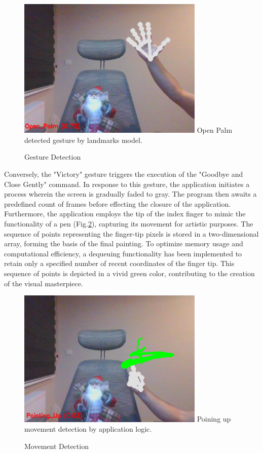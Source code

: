 \documentclass[journal]{IEEEtran}
\begin{document}
\begin{figure}[!t]
  \centering
  \includegraphics[width=3.5in]{photo/1.png}
  Open Palm detected gesture by landmarks model.
  \caption{Gesture Detection}
  \label{fig:gesture_detect}
\end{figure}

Conversely, the "Victory" gesture triggers the execution of the "Goodbye and Close Gently" command. In response to this gesture, the 
application initiates a process wherein the screen is gradually faded to gray. The program then awaits a predefined count of frames before 
effecting the closure of the application.
Furthermore, the application employs the tip of the index finger to mimic the functionality of a pen (Fig.\ref{fig:move_detect}), capturing its movement for artistic 
purposes. The sequence of points representing the finger-tip pixels is stored in a two-dimensional array, forming the basis of the final 
painting. To optimize memory usage and computational efficiency, a dequeuing functionality has been implemented to retain only a specified 
number of recent coordinates of the finger tip. This sequence of points is depicted in a vivid green color, contributing to the creation 
of the visual masterpiece.

\begin{figure}[!t]
  \centering
  \includegraphics[width=3.5in]{photo/2.png}
  Poining up movement detection by application logic.
  \caption{Movement Detection}
  \label{fig:move_detect}
\end{figure}
\end{document}

